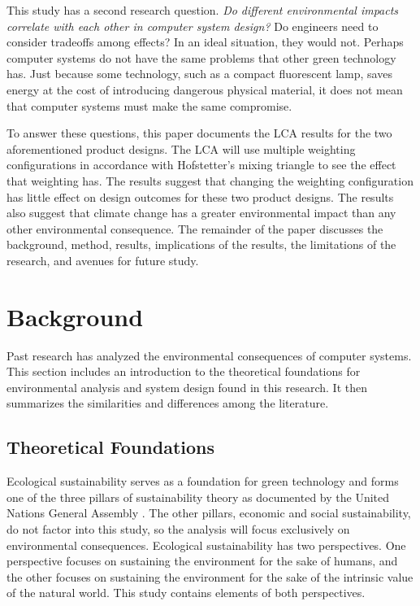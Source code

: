 \documentclass[final,journal,10pt,letterpaper,oneside,twocolumn,compsoc]%
{IEEEtran}
\begin{document}
This study has a second research question. \textit{Do different environmental impacts
correlate with each other in computer system
design?} Do engineers need to consider tradeoffs among effects? In an ideal
situation, they would not. Perhaps computer systems do not have the same
problems that other green technology has. Just because some technology, such as
a compact fluorescent lamp, saves energy at the cost of introducing dangerous
physical material, it
does not mean that computer systems must make the same compromise.

To answer these questions, this paper documents the LCA results for the two
aforementioned product designs. The LCA will use multiple weighting
configurations in accordance with Hofstetter's mixing triangle to see the effect
that weighting has. The results suggest that changing the weighting
configuration has little effect on design outcomes for these two product
designs. The
results also suggest that climate change has a greater environmental impact than
any other environmental consequence. The remainder of the paper discusses the background, method, results,
implications of the results, the limitations of the research, and avenues for
future study.

\section{Background}
Past research has analyzed the
environmental consequences of computer systems. This section includes an
introduction to the theoretical foundations for environmental analysis and
system design found in this research. It then summarizes the similarities and
differences among the literature.

\subsection{Theoretical Foundations}
Ecological sustainability serves as a foundation for green technology and
forms one of the three pillars of sustainability theory as documented by the
United Nations General Assembly
\cite{un}. The other pillars, economic and social sustainability, do not factor
into this study, so the analysis will focus exclusively on environmental
consequences. Ecological sustainability has two perspectives. One perspective
focuses on sustaining the environment for the sake of humans, and the other
focuses on sustaining the environment for the sake of the intrinsic value of the
natural world. This study contains elements of both perspectives.
\end{document}
